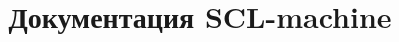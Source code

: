 \documentclass{scndocument}
\begin{document}
\DeactivateBG
\title{\centering
Документация SCL-machine}
\author{}
\maketitle

\normalsize

\setcounter{page}{3}

\ActivateBG
\begin{SCn}

\end{SCn}
\end{document}
